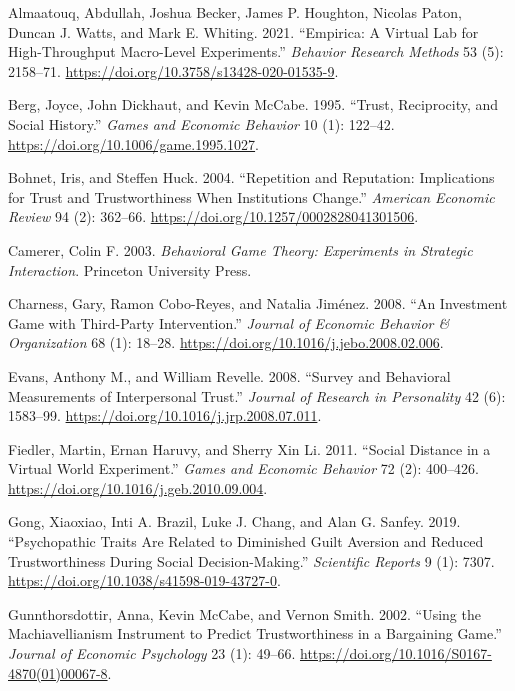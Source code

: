 \documentclass[
]{article}
\newlength{\cslhangindent}
\newenvironment{CSLReferences}[2] %
 {\begin{list}{}{%
  \setlength{\itemindent}{0pt}
  \setlength{\leftmargin}{0pt}
  \setlength{\parsep}{0pt}
  \ifodd #1
   \setlength{\leftmargin}{\cslhangindent}
   \setlength{\itemindent}{-1\cslhangindent}
  \fi
  \setlength{\itemsep}{#2\baselineskip}}}
 {\end{list}}
\begin{document}
\label{refs}
\begin{CSLReferences}{1}{0}
Almaatouq, Abdullah, Joshua Becker, James P. Houghton, Nicolas Paton, Duncan J. Watts, and Mark E. Whiting. 2021. {``{Empirica}: A Virtual Lab for High-Throughput Macro-Level Experiments.''} \emph{Behavior Research Methods} 53 (5): 2158--71. \url{https://doi.org/10.3758/s13428-020-01535-9}.

Berg, Joyce, John Dickhaut, and Kevin McCabe. 1995. {``Trust, Reciprocity, and Social History.''} \emph{Games and Economic Behavior} 10 (1): 122--42. \url{https://doi.org/10.1006/game.1995.1027}.

Bohnet, Iris, and Steffen Huck. 2004. {``Repetition and Reputation: {Implications} for Trust and Trustworthiness When Institutions Change.''} \emph{American Economic Review} 94 (2): 362--66. \url{https://doi.org/10.1257/0002828041301506}.

Camerer, Colin F. 2003. \emph{Behavioral Game Theory: {Experiments} in Strategic Interaction}. Princeton University Press.

Charness, Gary, Ramon Cobo-Reyes, and Natalia Jiménez. 2008. {``An Investment Game with Third-Party Intervention.''} \emph{Journal of Economic Behavior \& Organization} 68 (1): 18--28. \url{https://doi.org/10.1016/j.jebo.2008.02.006}.

Evans, Anthony M., and William Revelle. 2008. {``Survey and Behavioral Measurements of Interpersonal Trust.''} \emph{Journal of Research in Personality} 42 (6): 1583--99. \url{https://doi.org/10.1016/j.jrp.2008.07.011}.

Fiedler, Martin, Ernan Haruvy, and Sherry Xin Li. 2011. {``Social Distance in a Virtual World Experiment.''} \emph{Games and Economic Behavior} 72 (2): 400--426. \url{https://doi.org/10.1016/j.geb.2010.09.004}.

Gong, Xiaoxiao, Inti A. Brazil, Luke J. Chang, and Alan G. Sanfey. 2019. {``Psychopathic Traits Are Related to Diminished Guilt Aversion and Reduced Trustworthiness During Social Decision-Making.''} \emph{Scientific Reports} 9 (1): 7307. \url{https://doi.org/10.1038/s41598-019-43727-0}.

Gunnthorsdottir, Anna, Kevin McCabe, and Vernon Smith. 2002. {``Using the {Machiavellianism} Instrument to Predict Trustworthiness in a Bargaining Game.''} \emph{Journal of Economic Psychology} 23 (1): 49--66. \url{https://doi.org/10.1016/S0167-4870(01)00067-8}.


\end{CSLReferences}
\end{document}
